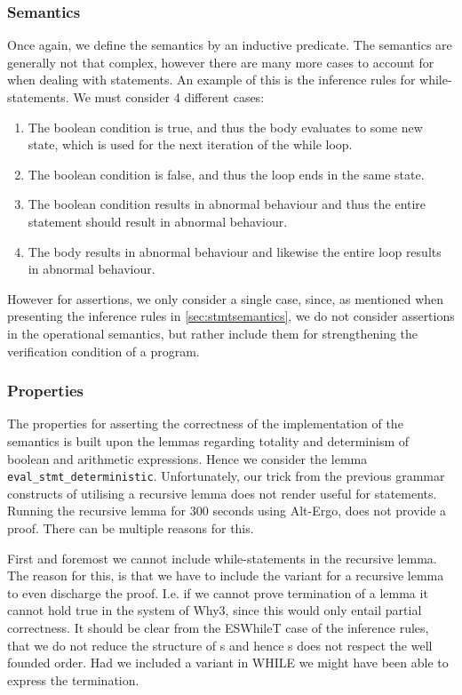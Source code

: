 \subsubsection{Semantics}
Once again, we define the semantics by an inductive predicate. The semantics are generally not that complex,
however there are many more cases to account for when dealing with statements.
An example of this is the inference rules for while-statements.
We must consider 4 different cases:

\begin{enumerate}
  \item The boolean condition is true, and thus the body evaluates to some new state, which is used for the next iteration of the while loop.
  \item The boolean condition is false, and thus the loop ends in the same state.
  \item The boolean condition results in abnormal behaviour and thus the entire statement should result in abnormal behaviour.
  \item The body results in abnormal behaviour and likewise the entire loop results in abnormal behaviour.
\end{enumerate}

However for assertions, we only consider a single case, since, as mentioned when presenting the inference rules in \ref{sec:stmtsemantics},
we do not consider assertions in the operational semantics, but rather include them for strengthening the
verification condition of a program.

\subsubsection{Properties}
The properties for asserting the correctness of the implementation of the semantics is built
upon the lemmas regarding totality and determinism of boolean and arithmetic expressions.
Hence we consider the lemma
\texttt{eval_stmt_deterministic}. Unfortunately, our trick from the previous grammar constructs of utilising a recursive lemma does not render useful for statements.
Running the recursive lemma for 300 seconds using Alt-Ergo, does not provide a proof.
There can be multiple reasons for this.

First and foremost we cannot include while-statements in the recursive lemma. The reason for this, is that we have to
include the variant for a recursive lemma to even discharge the proof.
I.e. if we cannot prove termination of a lemma it cannot hold true in the system of Why3, since this would only entail partial correctness.
It should be clear from the ESWhileT case of the inference rules, that we do not reduce the structure of s and hence s does not respect the well founded order.
Had we included a variant in WHILE we might have been able to express the termination.

